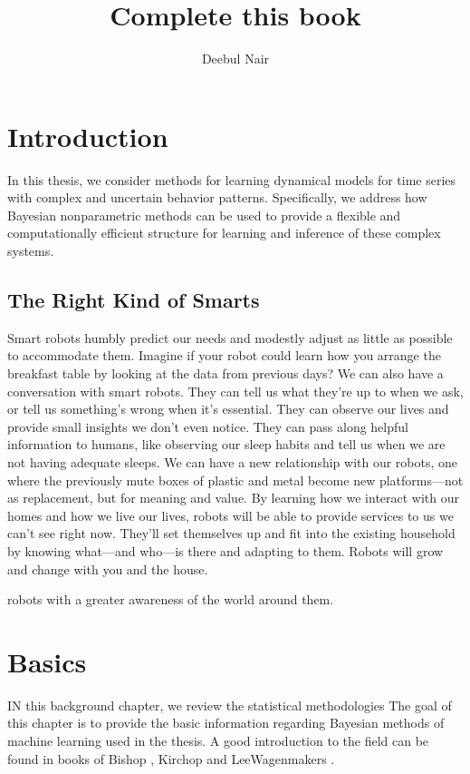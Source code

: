 \documentclass[11pt]{book}
\title{\textbf{Complete this book }}
\author{Deebul Nair}
\date{}
\begin{document}
\maketitle


\chapter{Introduction}


In this thesis, we consider methods for learning dynamical models for time series with complex and uncertain behavior patterns. Specifically, we address how Bayesian nonparametric methods can be used to provide a flexible and computationally efficient structure for learning and inference of these complex systems.
\section{ The Right Kind of Smarts }
Smart robots humbly predict our needs and modestly adjust as little as possible to accommodate them. Imagine if your robot could learn how you arrange the breakfast table by looking at the data from previous days? 
We can also have a conversation with smart robots. They can tell us what they’re up to when we ask, or tell us something’s wrong when it’s essential. They can observe our lives and provide small insights we don’t even notice. They can pass along helpful information to humans, like observing our sleep habits and tell us when we are not having adequate sleeps.
We can have a new relationship with our robots, one where the previously mute boxes of plastic and metal become new platforms—not as replacement, but for meaning and value. By learning how we interact with our homes and how we live our lives, robots will be able to provide services to us we can’t see right now. They’ll set themselves up and fit into the existing household by knowing what—and who—is there and adapting to them. Robots will grow and change with you and the house.

robots with a greater awareness of the world around them.
\chapter{Basics}

IN this background chapter, we review the statistical methodologies 
The goal of this chapter is to provide the basic information regarding Bayesian methods of machine learning used in the thesis. A good introduction to the field can be found in books of Bishop \cite{}, Kirchop \cite{} and LeeWagenmakers \cite{} . 
\end{document}
